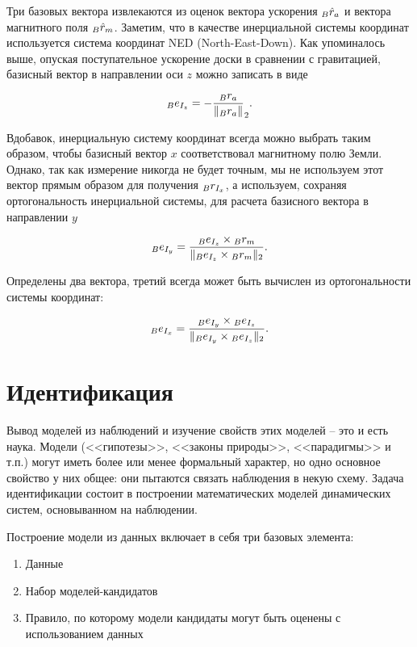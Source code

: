 \documentclass[12pt,a4paper]{article}
\begin{document}
Три базовых вектора извлекаются из оценок вектора ускорения ${\vphantom r}_B \hat r_a$ и вектора магнитного поля ${\vphantom r}_B \hat r_m$. Заметим, что в качестве инерциальной системы координат используется система координат NED (North-East-Down). Как упоминалось выше, опуская поступательное ускорение доски в сравнении с гравитацией, базисный вектор в направлении оси $z$ можно записать в виде

$$ {\vphantom e}_B e_{I_z} = -\frac{{\vphantom r}_B r_a}{\|{\vphantom r}_B r_a\|}_2 .$$

Вдобавок, инерциальную систему координат всегда можно выбрать таким образом, чтобы базисный вектор $x$ соответствовал магнитному полю Земли. Однако, так как измерение никогда не будет точным, мы не используем этот вектор прямым образом для получения ${\vphantom r}_B r_{I_x}$, а используем, сохраняя ортогональность инерциальной системы, для расчета базисного вектора в направлении $y$

$$ {\vphantom e}_B e_{I_y} = \frac{{\vphantom e}_B e_{I_z} \times {\vphantom r}_B r_m}{\| {\vphantom e}_B e_{I_z} \times {\vphantom r}_B r_m\|_2} .$$

Определены два вектора, третий всегда может быть вычислен из ортогональности системы координат:

$$ {\vphantom e}_B e_{I_x} = \frac{{\vphantom e}_B e_{I_y} \times {\vphantom e}_B e_{I_z}}
	{\| {\vphantom e}_B e_{I_y} \times {\vphantom e}_B e_{I_z} \|_2} .$$

\section{Идентификация}

Вывод моделей из наблюдений и изучение свойств этих моделей -- это и есть наука. Модели (<<гипотезы>>, <<законы природы>>, <<парадигмы>> и т.п.) могут иметь более или менее формальный характер, но одно основное свойство у них общее: они пытаются связать наблюдения в некую схему. Задача идентификации состоит в построении математических моделей динамических систем, основыванном на наблюдении.

Построение модели из данных включает в себя три базовых элемента:

\begin{enumerate}
	\item Данные
	\item Набор моделей-кандидатов
	\item Правило, по которому модели кандидаты могут быть оценены с использованием данных
\end{enumerate}
\end{document}
